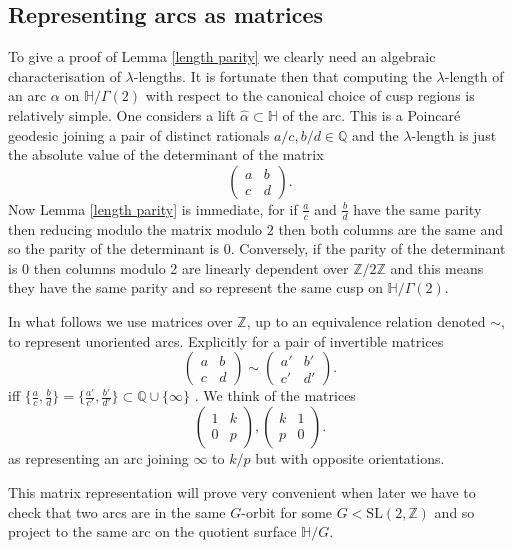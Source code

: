 \documentclass[12pt,a4paper]{amsart}
\def\HH{\mathbb{H}}
\def\g2{\Gamma(2)}
\def\xx{\HH/\g2}
\def\ZZ{\mathbb{Z}}
\def\sl2{\mathrm{SL}(2, \ZZ)}
\begin{document}
\subsection{Representing arcs as matrices}
To give a proof of Lemma \ref{length parity}
we clearly need an algebraic characterisation of $\lambda$-lengths.
It is fortunate then that computing the $\lambda$-length of an arc $\alpha$ on $\xx$
with respect to the canonical choice of cusp regions
is relatively simple.
One considers a lift $\hat{\alpha}\subset \mathbb{H}$ of the arc.
This is a Poincaré geodesic joining a pair of distinct rationals
$a/c,b/d \in \mathbb{Q}$ and the $\lambda$-length is just
the absolute value of the determinant of the matrix
$$ 
 \begin{pmatrix} a & b \\ c & d \end{pmatrix}.
$$
Now Lemma \ref{length parity}
is immediate, for if $\frac{a}{c}$ and $\frac{b}{d}$
have the same parity then reducing modulo the 
matrix modulo $2$ then both columns are the same
and so the parity of the determinant is $0$.
Conversely, if the parity of the determinant is $0$
then columns  modulo 2 are linearly dependent over
$\mathbb{Z}/2\mathbb{Z}$ and this means they have the same parity
and so represent the same cusp on $\xx$.

In what follows we use matrices over $\mathbb{Z}$,
up to an equivalence relation denoted $\sim$,
to represent unoriented arcs.
Explicitly  for a pair of invertible matrices 
$$ 
 \begin{pmatrix} a & b \\ c & d \end{pmatrix} \sim
 \begin{pmatrix} a' & b' \\ c' & d' \end{pmatrix}.
$$
iff $\{\frac{a}{c}, \frac{b}{d}\} = \{\frac{a'}{c'}, \frac{b'}{d'}\}
\subset \mathbb{Q}\cup \{\infty\}$
. 
We think of the matrices 
$$
 \begin{pmatrix} 1 & k \\ 0 & p \end{pmatrix},
 \begin{pmatrix} k & 1 \\ p  & 0 \end{pmatrix}.
$$
as representing an arc joining $\infty$ to $k/p$
but with opposite orientations.

This matrix representation will prove very convenient when later we
have to check that two arcs are in the same $G$-orbit for some $G <
\sl2$ and so project to the same arc on the quotient surface
$\mathbb{H}/G$.
\end{document}

